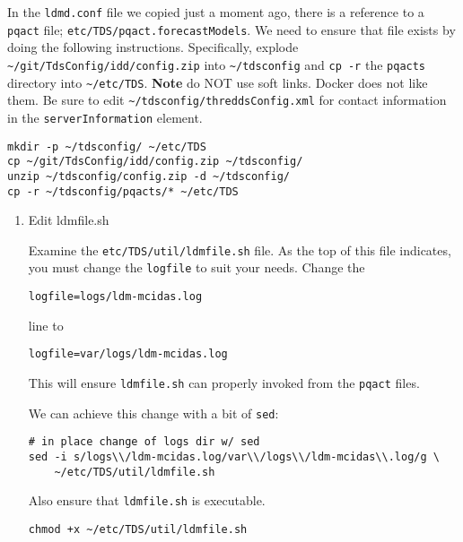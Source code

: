 \documentclass[onecolumn,9pt]{article}
\begin{document}
In the \texttt{ldmd.conf} file we copied just a moment ago, there is a reference to a \texttt{pqact} file; \texttt{etc/TDS/pqact.forecastModels}. We need to ensure that file exists by doing the following instructions. Specifically, explode \texttt{\textasciitilde{}/git/TdsConfig/idd/config.zip} into \texttt{\textasciitilde{}/tdsconfig} and \texttt{cp -r} the \texttt{pqacts} directory into \texttt{\textasciitilde{}/etc/TDS}. \textbf{Note} do NOT use soft links. Docker does not like them. Be sure to edit \texttt{\textasciitilde{}/tdsconfig/threddsConfig.xml} for contact information in the \texttt{serverInformation} element.

\lstset{frame=lines,basicstyle=\footnotesize,numbers=left,numberstyle=\tiny,language=sh,label= ,caption= ,captionpos=b}
\begin{lstlisting}
mkdir -p ~/tdsconfig/ ~/etc/TDS
cp ~/git/TdsConfig/idd/config.zip ~/tdsconfig/
unzip ~/tdsconfig/config.zip -d ~/tdsconfig/
cp -r ~/tdsconfig/pqacts/* ~/etc/TDS
\end{lstlisting}

\begin{enumerate}
\item Edit ldmfile.sh
\label{sec:orgheadline22}

Examine the \texttt{etc/TDS/util/ldmfile.sh} file. As the top of this file indicates, you must change the \texttt{logfile} to suit your needs. Change the 

\begin{verbatim}
logfile=logs/ldm-mcidas.log
\end{verbatim}

line to

\begin{verbatim}
logfile=var/logs/ldm-mcidas.log
\end{verbatim}

This will ensure \texttt{ldmfile.sh} can properly invoked from the \texttt{pqact} files.

We can achieve this change with a bit of \texttt{sed}:

\lstset{frame=lines,basicstyle=\footnotesize,numbers=left,numberstyle=\tiny,language=sh,label= ,caption= ,captionpos=b}
\begin{lstlisting}
# in place change of logs dir w/ sed
sed -i s/logs\\/ldm-mcidas.log/var\\/logs\\/ldm-mcidas\\.log/g \
    ~/etc/TDS/util/ldmfile.sh
\end{lstlisting}

Also ensure that \texttt{ldmfile.sh} is executable.

\lstset{frame=lines,basicstyle=\footnotesize,numbers=left,numberstyle=\tiny,language=sh,label= ,caption= ,captionpos=b}
\begin{lstlisting}
chmod +x ~/etc/TDS/util/ldmfile.sh
\end{lstlisting}
\end{enumerate}
\end{document}

